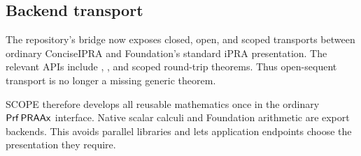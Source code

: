 \subsection{Backend transport}

The repository's bridge now exposes closed, open, and scoped transports between ordinary ConciseIPRA and Foundation's standard iPRA presentation.  The relevant APIs include , , and scoped round-trip theorems.  Thus open-sequent transport is no longer a missing generic theorem.

SCOPE therefore develops all reusable mathematics once in the ordinary \(\mathsf{Prf}\,\mathsf{PRAAx}\) interface.  Native scalar calculi and Foundation arithmetic are export backends.  This avoids parallel libraries and lets application endpoints choose the presentation they require.
